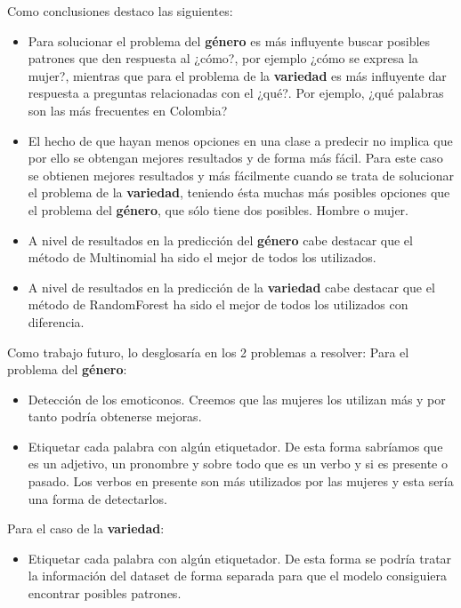 \documentclass[11pt,a4paper]{article}
\begin{document}
Como conclusiones destaco las siguientes:
\begin{itemize}
 \item Para solucionar el problema del \textbf{\textbf{g\'enero}} es m\'as influyente buscar posibles patrones que den respuesta al ¿c\'omo?, por ejemplo ¿c\'omo se expresa la mujer?, mientras que para el problema de la \textbf{variedad} es m\'as influyente dar respuesta a preguntas relacionadas con el ¿qu\'e?. Por ejemplo, ¿qu\'e palabras son las m\'as frecuentes en Colombia?
 \item El hecho de que hayan menos opciones en una clase a predecir no implica que por ello se obtengan mejores resultados y de forma m\'as f\'acil. Para este caso se obtienen mejores resultados y m\'as f\'acilmente cuando se trata de solucionar el problema de la \textbf{variedad}, teniendo \'esta muchas m\'as posibles opciones que el problema del \textbf{\textbf{g\'enero}}, que s\'olo tiene dos posibles. Hombre o mujer.
 \item A nivel de resultados en la predicci\'on del \textbf{\textbf{g\'enero}} cabe destacar que el m\'etodo de Multinomial ha sido el mejor de todos los utilizados.
 \item A nivel de resultados en la predicci\'on de la \textbf{variedad} cabe destacar que el m\'etodo de RandomForest ha sido el mejor de todos los utilizados con diferencia.

\end{itemize}

Como trabajo futuro, lo desglosar\'ia en los 2 problemas a resolver:\newline
Para el problema del \textbf{\textbf{g\'enero}}:
\begin{itemize}
 \item Detecci\'on de los emoticonos. Creemos que las mujeres los utilizan m\'as y por tanto podr\'ia obtenerse mejoras.
 \item Etiquetar cada palabra con alg\'un etiquetador. De esta forma sabr\'iamos que es un adjetivo, un pronombre y sobre todo que es un verbo y si es presente o pasado. Los verbos en presente son m\'as utilizados por las mujeres y esta ser\'ia una forma de detectarlos.
\end{itemize}

Para el caso de la \textbf{variedad}:
\begin{itemize}
 \item Etiquetar cada palabra con alg\'un etiquetador. De esta forma se podr\'ia tratar la informaci\'on del dataset de forma separada para que el modelo consiguiera encontrar posibles patrones.
\end{itemize}
\end{document}
